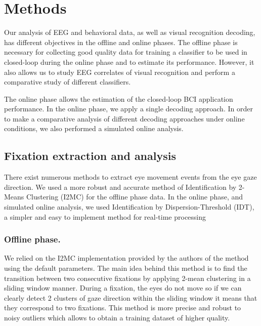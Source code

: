 \documentclass[12pt]{iopart}
\begin{document}
\section{Methods}
\label{sec:methods}
Our analysis of EEG and behavioral data, as well as visual
recognition decoding, has different objectives in the offline and online phases.
The offline phase is necessary for collecting good quality data
for training a classifier to be used in closed-loop during the online phase
and to estimate its performance. However, it also allows us 
to study EEG correlates of visual recognition and  perform a
comparative study of different classifiers.

The online phase allows the estimation of the closed-loop BCI
application performance.
In the online phase, we apply a single decoding approach. 
In order to make a comparative analysis of different
decoding approaches under online conditions,
we also performed a simulated online analysis. 

\subsection{Fixation extraction and analysis}
There exist numerous methods to extract eye movement events
from the eye gaze direction.
We used a more robust and accurate method of 
Identification by 2-Means Clustering (I2MC)
\cite{hessels_noise-robust_2017}
for the offline phase data.
In the online phase, and simulated online analysis,
we used Identification by Dispersion-Threshold (IDT), a simpler and
easy to implement method for real-time processing \cite{salvucci_identifying_2000}


\subsubsection*{Offline phase.}
We relied on the I2MC implementation provided by the authors of the method
using the default parameters.
The main idea behind this method is to find the transition between two consecutive fixations
by applying 2-mean clustering in a sliding window manner.
During a fixation, the eyes do not move so if we can clearly detect
2 clusters of gaze direction within the sliding window
it means that they correspond to two fixations.
This method is more precise and robust to noisy outliers which
allows to obtain a training dataset of higher quality.
\end{document}
